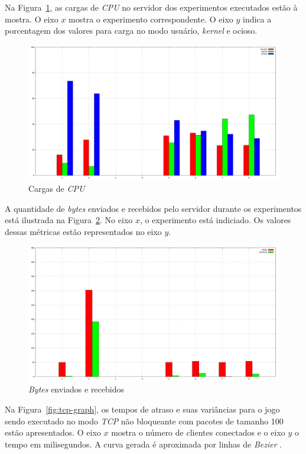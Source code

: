 \documentclass[12pt]{article}
\begin{document}
Na Figura~\ref{fig:cpu-graph}, as cargas de \emph{CPU} no servidor dos experimentos executados estão à mostra. O eixo $x$ mostra o experimento correspondente. O eixo $y$ indica a porcentagem dos valores para carga no modo usuário, \emph{kernel} e ocioso.

\begin{figure}[ht]
  \centering
  \includegraphics[width=1\textwidth]{img/cpu-graph.png}
  \caption{Cargas de \emph{CPU}}
  \label{fig:cpu-graph}
\end{figure}

A quantidade de \emph{bytes} enviados e recebidos pelo servidor durante os experimentos está ilustrada na Figura~\ref{fig:net-graph}. No eixo $x$, o experimento está indiciado. Os valores dessas métricas estão representados no eixo $y$.

\begin{figure}[ht]
  \centering
  \includegraphics[width=1\textwidth]{img/delay-graph.png}
  \caption{\emph{Bytes} enviados e recebidos}
  \label{fig:net-graph}
\end{figure}

Na Figura~\ref{fig:tcp-graph}, os tempos de atraso e suas variâncias para o jogo sendo executado no modo \emph{TCP} não bloqueante com pacotes de tamanho 100 estão apresentados. O eixo $x$ mostra o número de clientes conectados e o eixo $y$ o tempo em milisegundos. A curva gerada é aproximada por linhas de \emph{Bezier} \cite{Bezier}.
\end{document}
